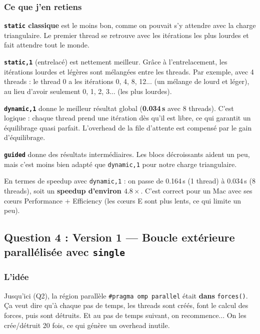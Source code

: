 \documentclass[12pt,a4paper]{article}
\begin{document}
\subsubsection{Ce que j'en retiens}

\textbf{\textcolor{deeporange}{\texttt{static}} classique} est le moins bon, comme on pouvait s'y attendre avec la charge triangulaire. Le premier thread se retrouve avec les itérations les plus lourdes et fait attendre tout le monde.

\textbf{\textcolor{deeporange}{\texttt{static,1}}} (entrelacé) est nettement meilleur. Grâce à l'entrelacement, les itérations lourdes et légères sont mélangées entre les threads. Par exemple, avec 4 threads : le thread 0 a les itérations 0, 4, 8, 12... (un mélange de lourd et léger), au lieu d'avoir seulement 0, 1, 2, 3... (les plus lourdes).

\textbf{\textcolor{deeporange}{\texttt{dynamic,1}}} donne le meilleur résultat global (\textbf{0.034\,s} avec 8 threads). C'est logique : chaque thread prend une itération dès qu'il est libre, ce qui garantit un équilibrage quasi parfait. L'overhead de la file d'attente est compensé par le gain d'équilibrage.

\textbf{\textcolor{deeporange}{\texttt{guided}}} donne des résultats intermédiaires. Les blocs décroissants aident un peu, mais c'est moins bien adapté que \texttt{dynamic,1} pour notre charge triangulaire.

En termes de speedup avec \texttt{dynamic,1} : on passe de 0.164\,s (1 thread) à 0.034\,s (8 threads), soit un \textbf{speedup d'environ $4.8\times$}. C'est correct pour un Mac avec ses c\oe urs Performance + Efficiency (les c\oe urs E sont plus lents, ce qui limite un peu).


\subsection{Question 4 : Version 1 — Boucle extérieure parallélisée avec \texttt{single}}

\subsubsection{L'idée}

Jusqu'ici (Q2), la région parallèle \texttt{\#pragma omp parallel} était \textbf{dans} \texttt{forces()}. Ça veut dire qu'à chaque pas de temps, les threads sont créés, font le calcul des forces, puis sont détruits. Et au pas de temps suivant, on recommence... On les crée/détruit 20 fois, ce qui génère un overhead inutile.
\end{document}
